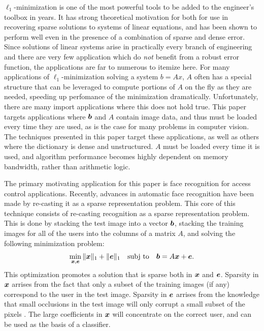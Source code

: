 \documentclass[10pt,twocolumn,letterpaper]{article}
\begin{document}
$\ell_1$-minimization is one of the most powerful tools to be added to the engineer's
toolbox in years.  It has strong theoretical motivation for both for use in recovering sparse
solutions to systems of linear equations, and has been shown to perform well even in the
presence of a combination of sparse and dense error.  Since solutions of linear systems
arise in practically every branch of engineering and there are very few application which
do {\em not} benefit from a robust error function, the applications are far to numerous to
itemize here.  
For many applications of $\ell_1$-minimization solving a system $b=Ax$, $A$ often has a
special structure that can be leveraged to compute portions of $A$ on the fly
as they are needed, speeding up perfomance of the minimization dramatically.
Unfortunately, there are many import applications where this does not hold true.
This paper targets applications where $\boldsymbol{b}$ and $A$ contain
image data, and thus must be loaded every time they are used, as is the 
case for many problems in computer vision.
The techniques presented in this paper target these applications, as well
as others where the dictionary is dense and unstructured. $A$ must be loaded every time
it is used, and algorithm performance becomes highly dependent on memory bandwidth, rather
than arithmetic logic.

The primary motivating application for this paper is face recognition for access control applications.
Recently, advances in automatic face recognition have been made by re-casting
it as a sparse representation problem.  This core of this technique consists of
re-casting recognition as a sparse representation problem. This is done by  
stacking the test image into a vector $\boldsymbol{b}$, stacking the training images for
all of the users into the columns of a matrix $A$, and solving the following
minimization problem:
\begin{equation}
\min_{{\boldsymbol{x}}, \boldsymbol{e}} \| {\boldsymbol{x}} \|_1 + \|\boldsymbol{e}\|_1 \quad \textup{subj to} \quad \boldsymbol{b} = A {\boldsymbol{x}} + \boldsymbol{e}.
\end{equation}
This optimization promotes a solution that is sparse both in ${\boldsymbol{x}}$ and $\boldsymbol{e}$. 
Sparsity in ${\boldsymbol{x}}$ arrises from the fact that only a subset of the training images (if any)
correspond to the user in the test image.  Sparsity in $\boldsymbol{e}$ arrises from the knowledge
that small occlusions in the test image will only corrupt a small subset of the pixels \cite{Wright2009-PAMI}.
The large coefficients in ${\boldsymbol{x}}$ will concentrate on the correct user, and can be used as the basis of a classifier.
\end{document}
